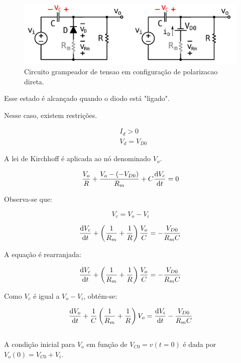 \begin{figure}[h]
    \centering
    \includegraphics[width=1\columnwidth]{images/o_circuito_direto.png}
    \caption{Circuito grampeador de tensao em configuração de polarizacao direta.}
\end{figure}

Esse estado é alcançado quando o diodo está "ligado".

Nesse caso, existem restrições.

\begin{equation}
    \begin{aligned}
         & I_d > 0      \\
         & V_d = V_{D0}
    \end{aligned}
\end{equation}

A lei de Kirchhoff é aplicada ao nó denominado $V_o$.

\begin{equation}
    \frac{V_o}{R} + \frac{V_o - ( - V_{D0})}{R_m} + C \frac{\mathrm d V_c}{\mathrm d t} = 0
\end{equation}

Observa-se que:

\begin{equation}
    V_c = V_o - V_i
\end{equation}

\begin{equation}
    \frac{\mathrm d V_c}{\mathrm d t} + \left( \frac{1}{R_m} + \frac{1}{R} \right) \frac{V_o}{C} = - \frac{V_{D0}}{R_m C}
\end{equation}

A equação é rearranjada:

\begin{equation}
    \frac{\mathrm d V_c}{\mathrm d t} + \left( \frac{1}{R_m} + \frac{1}{R}\right) \frac{V_o}{C} = - \frac{V_{D0}}{R_m C}
\end{equation}

Como $V_c$ é igual a $V_o - V_i$, obtém-se:

\begin{equation}
    \label{eq:diff_eq1}
    \frac{\mathrm d V_o}{\mathrm d t} + \frac{1}{C} \left(\frac{1}{R_m} + \frac{1}{R} \right) V_o = \frac{\mathrm d V_i}{\mathrm d t} - \frac{V_{D0}}{R_m C}
\end{equation}
\\
A condição inicial para $V_o$ em função de $V_{C0} = v(t=0)$ é dada por $V_o(0) = V_{C0} + V_i$.


